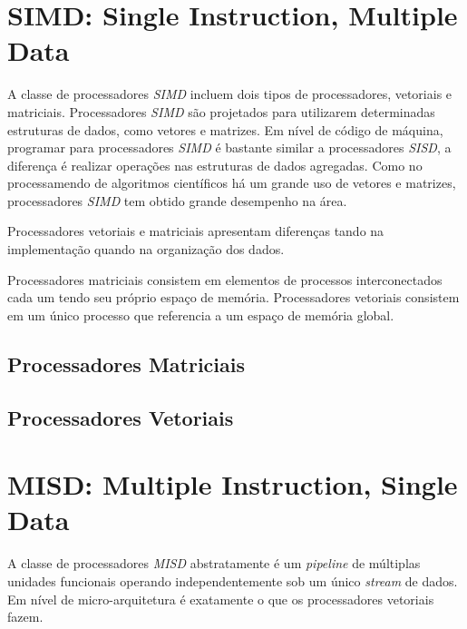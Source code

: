 \section{SIMD: Single Instruction, Multiple Data}

A classe de processadores \textit{SIMD} incluem dois tipos de
processadores, vetoriais e matriciais.
Processadores \textit{SIMD} são projetados para utilizarem determinadas
estruturas de dados, como vetores e matrizes. 
Em nível de código de máquina, programar para processadores \textit{SIMD} é 
bastante similar a processadores \textit{SISD}, a diferença é realizar operações
nas estruturas de dados agregadas. Como no processamendo de algoritmos 
científicos há um grande uso de vetores e matrizes, processadores \textit{SIMD}
tem obtido grande desempenho na área.

Processadores vetoriais e matriciais apresentam diferenças tando na 
implementação quando na organização dos dados.

Processadores matriciais consistem em elementos de processos interconectados
cada um tendo seu próprio espaço de memória. Processadores vetoriais consistem
em um único processo que referencia a um espaço de memória global.

\subsection{Processadores Matriciais}


\subsection{Processadores Vetoriais}


\section{MISD: Multiple Instruction, Single Data}

A classe de processadores \textit{MISD} abstratamente é um
\textit{pipeline} de múltiplas unidades funcionais operando independentemente
sob um único \textit{stream} de dados. Em nível de micro-arquitetura é
exatamente o que os processadores vetoriais fazem.

